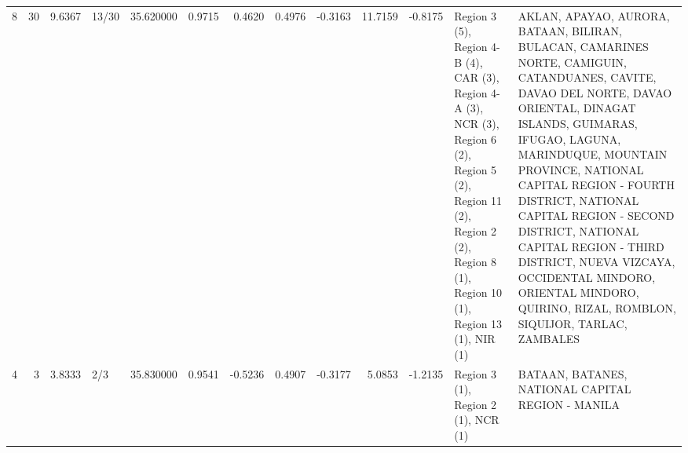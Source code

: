 \begin{tabular}{rrrlrrrrrrrll}
8 & 30 & {\cellcolor[HTML]{799CF8}} \color[HTML]{F1F1F1} 9.6367 & 13/30 & {\cellcolor[HTML]{F59F80}} \color[HTML]{000000} 35.620000 & 0.9715 & 0.4620 & 0.4976 & -0.3163 & 11.7159 & -0.8175 & Region 3 (5), Region 4-B (4), CAR (3), Region 4-A (3), NCR (3), Region 6 (2), Region 5 (2), Region 11 (2), Region 2 (2), Region 8 (1), Region 10 (1), Region 13 (1), NIR (1) & AKLAN, APAYAO, AURORA, BATAAN, BILIRAN, BULACAN, CAMARINES NORTE, CAMIGUIN, CATANDUANES, CAVITE, DAVAO DEL NORTE, DAVAO ORIENTAL, DINAGAT ISLANDS, GUIMARAS, IFUGAO, LAGUNA, MARINDUQUE, MOUNTAIN PROVINCE, NATIONAL CAPITAL REGION - FOURTH DISTRICT, NATIONAL CAPITAL REGION - SECOND DISTRICT, NATIONAL CAPITAL REGION - THIRD DISTRICT, NUEVA VIZCAYA, OCCIDENTAL MINDORO, ORIENTAL MINDORO, QUIRINO, RIZAL, ROMBLON, SIQUIJOR, TARLAC, ZAMBALES \\
4 & 3 & {\cellcolor[HTML]{3B4CC0}} \color[HTML]{F1F1F1} 3.8333 & 2/3 & {\cellcolor[HTML]{F59C7D}} \color[HTML]{000000} 35.830000 & 0.9541 & -0.5236 & 0.4907 & -0.3177 & 5.0853 & -1.2135 & Region 3 (1), Region 2 (1), NCR (1) & BATAAN, BATANES, NATIONAL CAPITAL REGION - MANILA \\
\bottomrule
\end{tabular}
